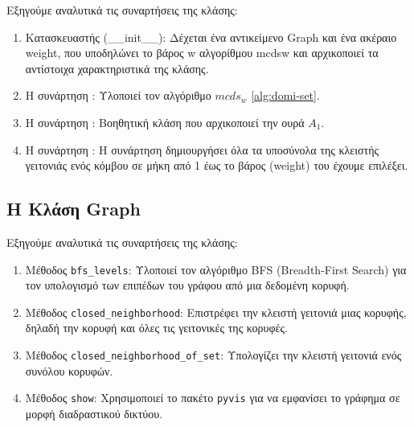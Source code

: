 

Εξηγούμε αναλυτικά τις συναρτήσεις της κλάσης:

\begin{enumerate}
	\item Κατασκευαστής (\_\_init\_\_): Δέχεται ένα αντικείμενο Graph και ένα ακέραιο weight, που υποδηλώνει το βάρος w αλγορίθμου mcdsw και αρχικοποιεί τα αντίστοιχα χαρακτηριστικά της κλάσης.
	\item Η συνάρτηση : Υλοποιεί τον αλγόριθμο $mcds_{w}$ \ref{alg:domi-set}.
	\item H συνάρτηση : Βοηθητική κλάση που αρχικοποιεί την ουρά $A_1$.
	\item H συνάρτηση :  H συνάρτηση δημιουργήσει όλα τα υποσύνολα της κλειστής γειτονιάς ενός κόμβου σε μήκη από 1 έως το βάρος (weight) του έχουμε επιλέξει.
\end{enumerate}

\subsection{H Kλάση Graph}



Εξηγούμε αναλυτικά τις συναρτήσεις της κλάσης:

\begin{enumerate}
	
	\item Μέθοδος \texttt{bfs\_levels}: Υλοποιεί τον αλγόριθμο BFS (Breadth-First Search) για τον υπολογισμό των επιπέδων του γράφου από μια δεδομένη κορυφή.
	
	\item Μέθοδος \texttt{closed\_neighborhood}: Επιστρέφει την κλειστή γειτονιά μιας κορυφής, δηλαδή την κορυφή και όλες τις γειτονικές της κορυφές.
	
	\item Μέθοδος \texttt{closed\_neighborhood\_of\_set}: Υπολογίζει την κλειστή γειτονιά ενός συνόλου κορυφών.
	
	\item Μέθοδος \texttt{show}: Χρησιμοποιεί το πακέτο \texttt{pyvis} για να εμφανίσει το γράφημα σε μορφή διαδραστικού δικτύου.
	
\end{enumerate}

